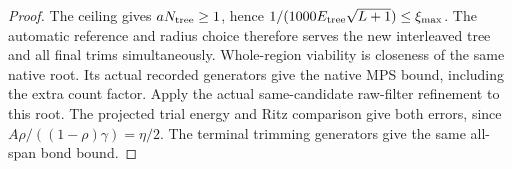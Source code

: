 \begin{proof}\leanok
    The ceiling gives $aN_{\rm tree}\ge1$, hence
    $1/(1000E_{\rm tree}\sqrt{L+1})\le\xi_{\max}$.
    The automatic reference and radius choice therefore serves the new
    interleaved tree and all final trims simultaneously. Whole-region
    viability is closeness of the same native root. Its actual recorded
    generators give the native MPS bound, including the extra count factor.
    Apply the actual same-candidate raw-filter refinement to this root.
    The projected trial energy and Ritz comparison give both errors, since
    $A\rho/((1-\rho)\gamma)=\eta/2$. The terminal trimming generators
    give the same all-span bond bound.
\end{proof}


